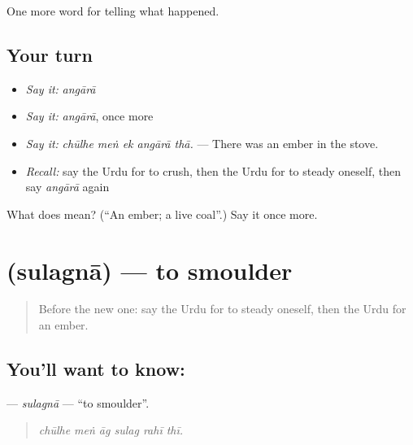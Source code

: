 \begin{grammarlens}[title={What you've built}]
One more word for telling what happened.
\end{grammarlens}

\subsection*{Your turn}
\begin{itemize}
\raggedright
  \item \emph{Say it:} \emph{angārā}
  \item \emph{Say it:} \emph{angārā}, once more
  \item \emph{Say it:} \emph{chūlhe meṅ ek angārā thā.} — There was an ember in the stove.
  \item \emph{Recall:} say the Urdu for to crush, then the Urdu for to steady oneself, then say \emph{angārā} again
\end{itemize}

\begin{tcolorbox}[breakable,colback=teal!4,colframe=teal!35!black,title={Before you move on}]
What does  mean? (\textquotedblleft{}An ember; a live coal\textquotedblright{}.) Say it once more.
\end{tcolorbox}
\section[\texorpdfstring{\ur{سلگنا} (sulagnā)}{سلگنا (sulagnā)}]{ (sulagnā) — to smoulder}

\label{lesson:UR-C287-sulagna}



\begin{quote}
Before the new one: say the Urdu for to steady oneself, then the Urdu for an ember.
\end{quote}

\subsection*{You'll want to know: }
\textbf{} — \emph{sulagnā} — \textquotedblleft{}to smoulder\textquotedblright{}.

\begin{quote}
     
\end{quote}

\begin{quote}
\emph{chūlhe meṅ āg sulag rahī thī.}
\end{quote}

